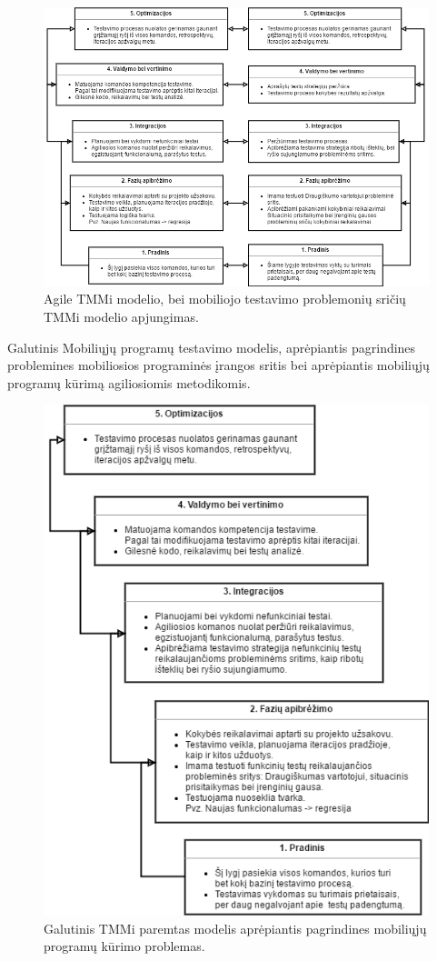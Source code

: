 \documentclass{VUMIFPSkursinis}
\begin{document}
\begin{figure}[H]
    \centering
    \includegraphics[scale=0.75, angle=90]{img/agilemobile}
    \caption{Agile TMMi modelio, bei mobiliojo testavimo problemonių sričių TMMi modelio apjungimas.}
    \label{img:agilemobile}
\end{figure}

Galutinis Mobiliųjų programų testavimo modelis, aprėpiantis pagrindines problemines mobiliosios programinės įrangos sritis bei aprėpiantis mobiliųjų programų kūrimą agiliosiomis metodikomis.
\begin{figure}[H]
    \centering
    \includegraphics[scale=0.75]{img/FinalTMMi}
    \caption{Galutinis TMMi paremtas modelis aprėpiantis pagrindines mobiliųjų programų kūrimo problemas.}
    \label{img:finaltmmi}
\end{figure}
\end{document}
